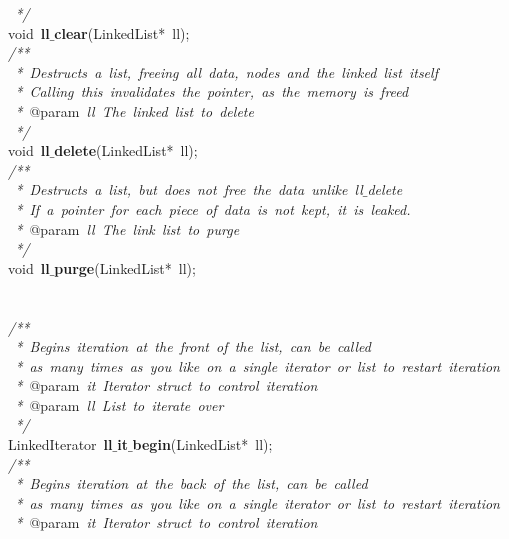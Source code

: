 \documentclass{article}
\begin{document}
\mbox{}\textit{\ */} \\
\mbox{}void\ \textbf{ll$\_$clear}(LinkedList*\ ll); \\
\mbox{}\textit{/**} \\
\mbox{}\textit{\ *\ Destructs\ a\ list,\ freeing\ all\ data,\ nodes\ and\ the\ linked\ list\ itself} \\
\mbox{}\textit{\ *\ Calling\ this\ invalidates\ the\ pointer,\ as\ the\ memory\ is\ freed} \\
\mbox{}\textit{\ *\ }@param\textit{\ ll\ The\ linked\ list\ to\ delete} \\
\mbox{}\textit{\ */} \\
\mbox{}void\ \textbf{ll$\_$delete}(LinkedList*\ ll); \\
\mbox{}\textit{/**} \\
\mbox{}\textit{\ *\ Destructs\ a\ list,\ but\ does\ not\ free\ the\ data\ unlike\ ll$\_$delete} \\
\mbox{}\textit{\ *\ If\ a\ pointer\ for\ each\ piece\ of\ data\ is\ not\ kept,\ it\ is\ leaked.} \\
\mbox{}\textit{\ *\ }@param\textit{\ ll\ The\ link\ list\ to\ purge} \\
\mbox{}\textit{\ */} \\
\mbox{}void\ \textbf{ll$\_$purge}(LinkedList*\ ll); \\
\mbox{} \\
\mbox{} \\
\mbox{}\textit{/**} \\
\mbox{}\textit{\ *\ Begins\ iteration\ at\ the\ front\ of\ the\ list,\ can\ be\ called} \\
\mbox{}\textit{\ *\ as\ many\ times\ as\ you\ like\ on\ a\ single\ iterator\ or\ list\ to\ restart\ iteration} \\
\mbox{}\textit{\ *\ }@param\textit{\ it\ Iterator\ struct\ to\ control\ iteration} \\
\mbox{}\textit{\ *\ }@param\textit{\ ll\ List\ to\ iterate\ over} \\
\mbox{}\textit{\ */} \\
\mbox{}LinkedIterator\ \textbf{ll$\_$it$\_$begin}(LinkedList*\ ll); \\
\mbox{}\textit{/**} \\
\mbox{}\textit{\ *\ Begins\ iteration\ at\ the\ back\ of\ the\ list,\ can\ be\ called} \\
\mbox{}\textit{\ *\ as\ many\ times\ as\ you\ like\ on\ a\ single\ iterator\ or\ list\ to\ restart\ iteration} \\
\mbox{}\textit{\ *\ }@param\textit{\ it\ Iterator\ struct\ to\ control\ iteration} \\
\end{document}
